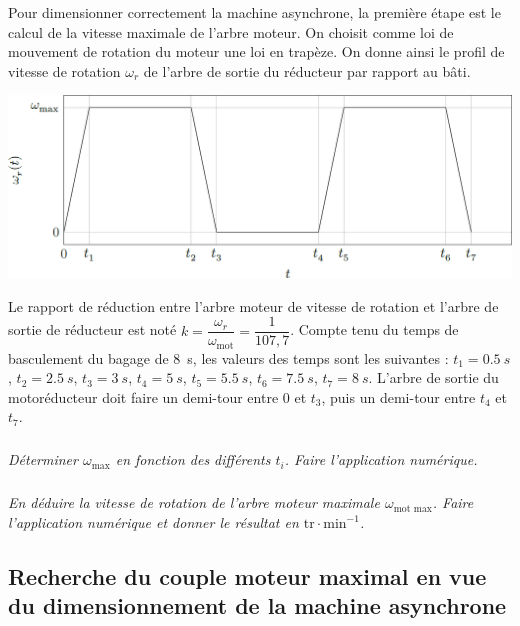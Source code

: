 \documentclass[10pt,fleqn]{article} %
\begin{document}
\begin{multicols}{2}
\begin{multicols}{2}
Pour dimensionner correctement la machine asynchrone, la première étape est le calcul de la vitesse maximale
de l’arbre moteur.
On choisit comme loi de mouvement de rotation du moteur une loi en trapèze. On donne ainsi le profil de vitesse de rotation $\omega_r$ de l’arbre de sortie du réducteur par rapport au bâti.

\begin{center}
\includegraphics[width=\linewidth]{images/fig_02}
\end{center}

Le rapport de réduction entre l’arbre moteur de vitesse de rotation et l’arbre de sortie de réducteur est noté $k=\dfrac{\omega_r}{\omega_{\text{mot}}} = \dfrac{1}{107,7}$.
Compte tenu du temps de basculement du bagage de \SI{8}{s}, les valeurs des temps sont les suivantes : $t_1=\SI{0,5}{s}$, $t_2=\SI{2,5}{s}$, $t_3=\SI{3}{s}$, $t_4=\SI{5}{s}$, $t_5=\SI{5,5}{s}$, $t_6=\SI{7,5}{s}$, $t_7=\SI{8}{s}$. L’arbre de sortie du motoréducteur doit faire un demi-tour entre 0 et $t_3$, puis un demi-tour entre $t_4$ et $t_7$.

\subparagraph{}\textit{Déterminer $\omega_{\text{max}}$ en fonction des différents 
$t_i$. Faire l’application numérique.}\textit{}
\ifprof
\begin{corrige}
\end{corrige}
\else
\fi
\subparagraph{}\textit{En déduire la vitesse de rotation de l’arbre moteur maximale $\omega_{\text{mot max}}$. Faire l’application numérique et donner le résultat en $\text{tr}\cdot\text{min}^{-1}$.}

\ifprof
\begin{corrige}
\end{corrige}
\else
\fi
\begin{center}

\subsection*{Recherche du couple moteur maximal en vue du dimensionnement de la machine asynchrone}


\end{center}
\end{multicols}
\end{multicols}
\end{document}
